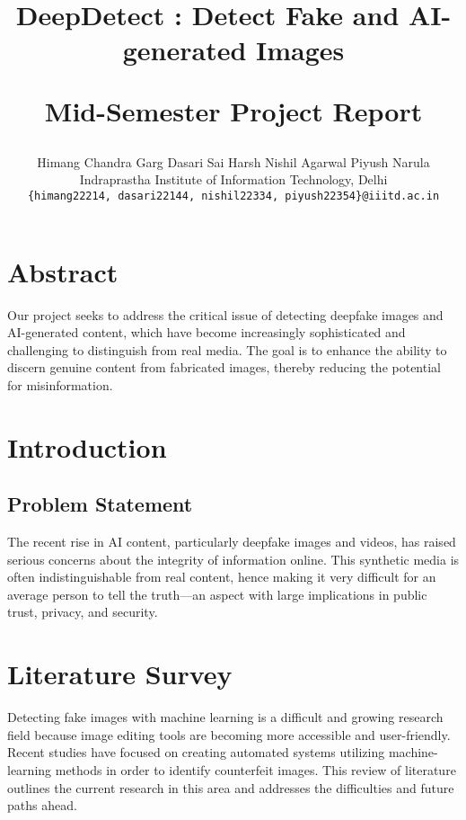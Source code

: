 \documentclass[10pt,twocolumn,letterpaper]{article}
\begin{document}
\title{\begin{center}
    DeepDetect : Detect Fake and AI-generated Images
\end{center}
Mid-Semester Project Report}

\author{Himang Chandra Garg \qquad Dasari Sai Harsh \qquad Nishil Agarwal \qquad Piyush Narula\\
Indraprastha Institute of Information Technology, Delhi\\
{\tt\small \{himang22214, dasari22144, nishil22334, piyush22354\}@iiitd.ac.in}
}

\maketitle

\pagestyle{empty}


\section{Abstract}

Our project seeks to address the critical issue of detecting deepfake images and AI-generated content, which have become increasingly sophisticated and challenging to distinguish from real media. 
The goal is to enhance the ability to discern genuine content from fabricated images, thereby reducing the potential for misinformation.

\section{Introduction}

\subsection{Problem Statement}

The recent rise in AI content, particularly deepfake images and videos, has raised serious concerns about the integrity of information online. 
This synthetic media is often indistinguishable from real content, hence making it very difficult for an average person to tell the truth—an aspect with large implications in public trust, privacy, and security.

\section{Literature Survey}
Detecting fake images with machine learning is a difficult and growing research field because image editing tools are becoming more accessible and user-friendly. Recent studies have focused on creating automated systems utilizing machine-learning methods in order to identify counterfeit images. This review of literature outlines the current research in this area and addresses the difficulties and future paths ahead.
\end{document}
